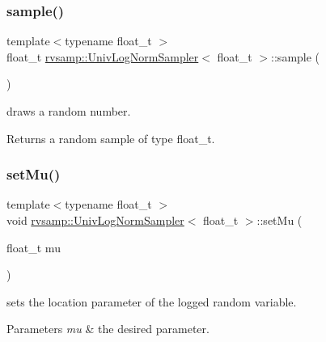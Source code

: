 \subsubsection{\texorpdfstring{sample()}{sample()}}
{\footnotesize\ttfamily template$<$typename float\+\_\+t $>$ \\
float\+\_\+t \hyperlink{classrvsamp_1_1UnivLogNormSampler}{rvsamp\+::\+Univ\+Log\+Norm\+Sampler}$<$ float\+\_\+t $>$\+::sample (\begin{DoxyParamCaption}{ }\end{DoxyParamCaption})}



draws a random number. 

\begin{DoxyReturn}{Returns}
a random sample of type float\+\_\+t. 
\end{DoxyReturn}
\mbox{\label{classrvsamp_1_1UnivLogNormSampler_af4d1a62b0cb1143290cac22922755a95}} 
\subsubsection{\texorpdfstring{set\+Mu()}{setMu()}}
{\footnotesize\ttfamily template$<$typename float\+\_\+t $>$ \\
void \hyperlink{classrvsamp_1_1UnivLogNormSampler}{rvsamp\+::\+Univ\+Log\+Norm\+Sampler}$<$ float\+\_\+t $>$\+::set\+Mu (\begin{DoxyParamCaption}\item[{float\+\_\+t}]{mu }\end{DoxyParamCaption})}



sets the location parameter of the logged random variable. 


\begin{DoxyParams}{Parameters}
{\em mu} & the desired parameter. \\
\hline
\end{DoxyParams}
\mbox{\label{classrvsamp_1_1UnivLogNormSampler_a17c3147be7048605a457297f44a0d269}} 
